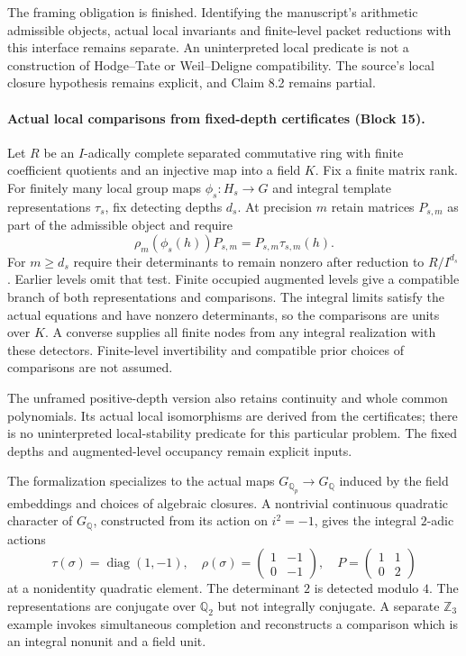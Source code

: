 \documentclass[11pt]{article}
\theoremstyle{definition}
\theoremstyle{remark}
\begin{document}
The framing obligation is finished. Identifying the manuscript's arithmetic
admissible objects, actual local invariants and finite-level packet reductions
with this interface remains separate. An uninterpreted local predicate is not
a construction of Hodge--Tate or Weil--Deligne compatibility. The source's local
closure hypothesis remains explicit, and Claim 8.2 remains partial.


\paragraph{Actual local comparisons from fixed-depth certificates (Block 15).}
Let $R$ be an $I$-adically complete separated commutative ring with finite
coefficient quotients and an injective map into a field $K$. Fix a finite matrix
rank. For finitely many
local group maps $\phi_s:H_s\to G$ and integral template representations
$\tau_s$, fix detecting depths $d_s$. At precision $m$ retain matrices $P_{s,m}$
as part of the admissible object and require
\[
\rho_m(\phi_s(h))P_{s,m}=P_{s,m}\tau_{s,m}(h).
\]
For $m\ge d_s$ require their determinants to remain nonzero after reduction to
$R/I^{d_s}$. Earlier levels omit that test. Finite occupied augmented levels
give a compatible branch of both representations and comparisons. The integral
limits satisfy the actual equations and have nonzero determinants, so the
comparisons are units over $K$. A converse supplies all finite nodes from any
integral realization with these detectors. Finite-level invertibility and
compatible prior choices of comparisons are not assumed.

The unframed positive-depth version also retains continuity and whole common
polynomials. Its actual local isomorphisms are derived from the certificates;
there is no uninterpreted local-stability predicate for this particular problem.
The fixed depths and augmented-level occupancy remain explicit inputs.

The formalization specializes to the actual maps
$G_{\mathbb Q_p}\to G_{\mathbb Q}$ induced by the field embeddings and choices
of algebraic closures. A nontrivial continuous quadratic character of
$G_{\mathbb Q}$, constructed from its action on $i^2=-1$, gives the integral
$2$-adic actions
\[
\tau(\sigma)=\operatorname{diag}(1,-1),\quad
\rho(\sigma)=\begin{pmatrix}1&-1\\0&-1\end{pmatrix},\quad
P=\begin{pmatrix}1&1\\0&2\end{pmatrix}
\]
at a nonidentity quadratic element. The determinant $2$ is detected modulo $4$.
The representations are conjugate over $\mathbb Q_2$ but not integrally
conjugate. A separate $\mathbb Z_3$ example invokes simultaneous completion
and reconstructs a comparison which is an integral nonunit and a field unit.
\end{document}
